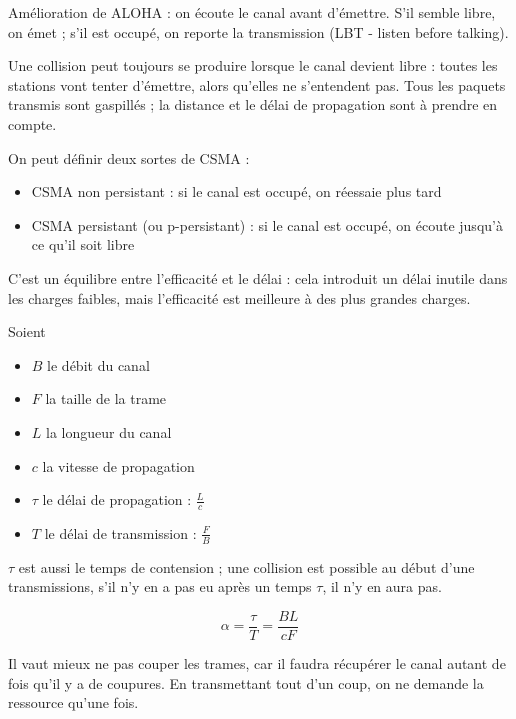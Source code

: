	Amélioration de ALOHA : on écoute le canal avant d'émettre. S'il semble libre, on émet ; s'il est occupé, on reporte la transmission (LBT - listen before talking).
	
	
	Une collision peut toujours se produire lorsque le canal devient libre : toutes les stations vont tenter d'émettre, alors qu'elles ne s'entendent pas. Tous les paquets transmis sont gaspillés ; la distance et le délai de propagation sont à prendre en compte.
	
	
	On peut définir deux sortes de CSMA :
	
	\begin{itemize}
		\item CSMA non persistant : si le canal est occupé, on réessaie plus tard
		\item CSMA persistant (ou p-persistant) : si le canal est occupé, on écoute jusqu'à ce qu'il soit libre
	\end{itemize}		
	
	
	C'est un équilibre entre l'efficacité et le délai : cela introduit un délai inutile dans les charges faibles, mais l'efficacité est meilleure à des plus grandes charges.
	
	
	Soient
	
	\begin{itemize}
		\item $B$ le débit du canal
		\item $F$ la taille de la trame
		\item $L$ la longueur du canal
		\item $c$ la vitesse de propagation
		
		\item $\tau$ le délai de propagation : $ \frac{L}{c} $
		\item $T$ le délai de transmission : $ \frac{F}{B} $
	\end{itemize}
	
	$\tau$ est aussi le temps de contension ; une collision est possible au début d'une transmissions, s'il n'y en a pas eu après un temps $\tau$, il n'y en aura pas.
	
	$$\alpha = \frac{\tau}{T} = \frac{BL}{cF}$$
	
	Il vaut mieux ne pas couper les trames, car il faudra récupérer le canal autant de fois qu'il y a de coupures. En transmettant tout d'un coup, on ne demande la ressource qu'une fois.
	
